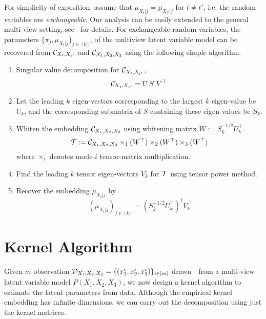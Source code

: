\documentclass[11pt]{article}
\begin{document}
For simplicity of exposition, assume that $\mu_{X_t|j} = \mu_{X_{t'}|j}$ for $t\neq t'$, i.e. the random variables are {\em exchangeable}. Our analysis can be easily extended to the general multi-view setting, see~\cite{AnandkumarEtal:tensor12} for details. For exchangeable random variables,  the parameters $\{\pi_j, \mu_{X_t|j}\}_{j \in [k]}$, of the multiview latent variable model can be recovered from $\mathcal{C}_{X_t,X_{t'}}$ and $\mathcal{C}_{X_1,X_2,X_3}$ using the following simple algorithm.
\begin{enumerate}
  \item Singular value decomposition for $\mathcal{C}_{X_t,X_{t'}}$,
    $$\mathcal{C}_{X_t,X_{t'}} = U\, S\,\, V^\top$$
  \item Let the leading $k$ eigen-vectors corresponding to the largest $k$ eigen-value be $U_k$, and the corresponding submatrix of $S$ containing these eigen-values be $S_k$.
  \item Whiten the embedding $\mathcal{C}_{X_1,X_2,X_3}$ using whitening matrix $W:=S_k^{-1/2}U_k^\top$. 
    $${\mathcal{T}} := \mathcal{C}_{X_1,X_2,X_3} \times_1 (W^\top) \times_2 (W^\top) \times_3 (W^\top)$$
    where $\times_i$ denotes mode-$i$ tensor-matrix multiplication.
  \item Find the leading $k$ tensor eigen-vectors $V_k$ for ${\mathcal{T}}$ using tensor power method.
  \item Recover the embedding $\mu_{X_t|j}$ by
    $$ (\mu_{X_t|j})_{j \in [k]}  = (S_k^{-1/2}U_k^\top)^\dagger V_k $$
\end{enumerate}

\section{Kernel Algorithm}

Given $m$ observation $\mathcal{D}_{X_1,X_2,X_3}=\{(x_1^i,x_2^i,x_3^i)\}_{i \in [m]}$ drawn~\iid~from a multi-view latent variable model $P(X_1,X_2,X_3)$, we now design a kernel algorithm to estimate the latent parameters from data. Although the empirical kernel embedding has infinite dimensions, we can carry out the decomposition using just the kernel matrices.
\end{document}
